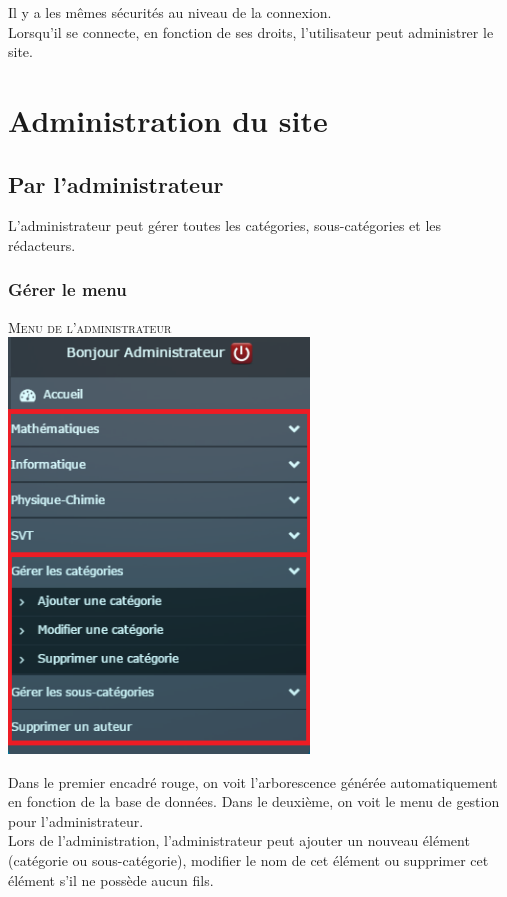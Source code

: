 \documentclass[hidelinks, 12pt,a4paper]{article}
\begin{document}
Il y a les mêmes sécurités au niveau de la connexion.\\
Lorsqu'il se connecte, en fonction de ses droits, l'utilisateur peut administrer le site.

\newpage
\section{Administration du site}
\subsection{Par l'administrateur}
L'administrateur peut gérer toutes les catégories, sous-catégories et les rédacteurs. 

\subsubsection{Gérer le menu}
\begin{center}
\textsc{Menu de l'administrateur}\\
\includegraphics[width=8cm]{images/menu2.png}\\
\end{center}

Dans le premier encadré rouge, on voit l'arborescence générée automatiquement en fonction de la base de données. Dans le deuxième, on voit le menu de gestion pour l'administrateur.\\

Lors de l'administration, l'administrateur peut ajouter un nouveau élément (catégorie ou sous-catégorie), modifier le nom de cet élément ou supprimer cet élément s'il ne possède aucun fils.\\
\end{document}
